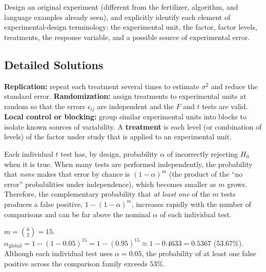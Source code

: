 \begin{problema}
\label{prob:fb4917f}
Design an original experiment (different from the fertilizer, algorithm, and language examples already seen), and explicitly identify each element of experimental-design terminology: the experimental unit, the factor, factor levels, treatments, the response variable, and a possible source of experimental error.
\end{problema}

\subsection*{Detailed Solutions}

\begin{solproblema}[prob:8d16ad2]
\textbf{Replication:} repeat each treatment several times to estimate $\sigma^2$ and reduce the standard error. \textbf{Randomization:} assign treatments to experimental units at random so that the errors $\epsilon_{ij}$ are independent and the $F$ and $t$ tests are valid. \textbf{Local control or blocking:} group similar experimental units into blocks to isolate known sources of variability. A \textbf{treatment} is each level (or combination of levels) of the factor under study that is applied to an experimental unit.
\end{solproblema}

\begin{solproblema}[prob:0b5e19a]
Each individual $t$ test has, by design, probability $\alpha$ of incorrectly rejecting $H_0$ when it is true. When many tests are performed independently, the probability that \emph{none} makes that error by chance is $(1-\alpha)^m$ (the product of the ``no error'' probabilities under independence), which becomes smaller as $m$ grows. Therefore, the complementary probability that \emph{at least one} of the $m$ tests produces a false positive, $1-(1-\alpha)^m$, increases rapidly with the number of comparisons and can be far above the nominal $\alpha$ of each individual test.
\end{solproblema}

\begin{solproblema}[prob:433c810]
$m=\binom{6}{2}=15$. $\alpha_{\text{global}} = 1-(1-0.05)^{15} = 1-(0.95)^{15} \approx1-0.4633 = 0.5367$ (53.67\%). Although each individual test uses $\alpha=0.05$, the probability of at least one false positive across the comparison family exceeds $53\%$.
\end{solproblema}

